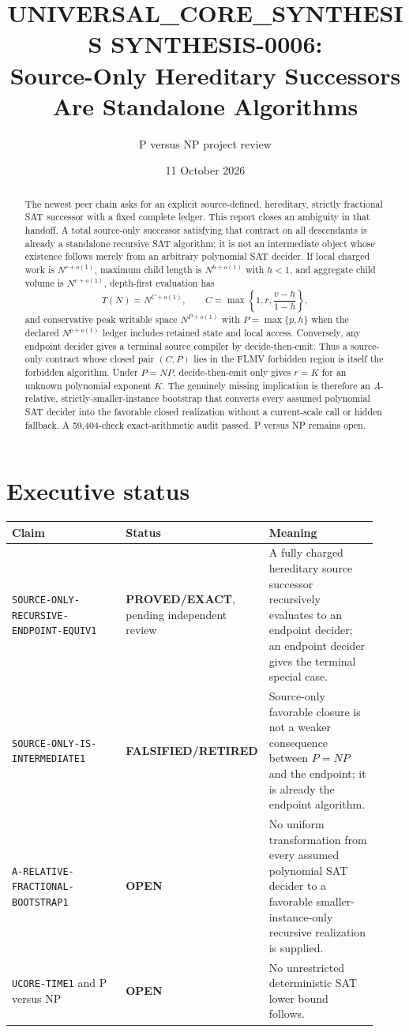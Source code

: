 \documentclass[11pt]{article}
\title{UNIVERSAL\_CORE\_SYNTHESIS SYNTHESIS-0006:\\
Source-Only Hereditary Successors Are Standalone Algorithms}
\author{P versus NP project review}
\date{11 October 2026}
\newcommand{\EXACT}{\textbf{PROVED/EXACT}}
\newcommand{\OPEN}{\textbf{OPEN}}
\newcommand{\RETIRED}{\textbf{FALSIFIED/RETIRED}}
\begin{document}
\maketitle

\begin{abstract}
The newest peer chain asks for an explicit source-defined, hereditary,
strictly fractional SAT successor with a fixed complete ledger.  This report
closes an ambiguity in that handoff.  A total source-only successor satisfying
that contract on all descendants is already a standalone recursive SAT
algorithm; it is not an intermediate object whose existence follows merely
from an arbitrary polynomial SAT decider.  If local charged work is
$N^{r+o(1)}$, maximum child length is $N^{h+o(1)}$ with $h<1$, and aggregate
child volume is $N^{v+o(1)}$, depth-first evaluation has
\[
 T(N)=N^{C+o(1)},\qquad
 C=\max\left\{1,r,\frac{v-h}{1-h}\right\},
\]
and conservative peak writable space $N^{P+o(1)}$ with
$P=\max\{p,h\}$ when the declared $N^{p+o(1)}$ ledger includes retained
state and local access.  Conversely, any endpoint decider gives a terminal
source compiler by decide-then-emit.  Thus a source-only contract whose
closed pair $(C,P)$ lies in the FLMV forbidden region is itself the forbidden
algorithm.  Under $P=NP$, decide-then-emit only gives $r=K$ for an unknown
polynomial exponent $K$.  The genuinely missing implication is therefore an
$A$-relative, strictly-smaller-instance bootstrap that converts every assumed
polynomial SAT decider into the favorable closed realization without a
current-scale call or hidden fallback.  A 59,404-check exact-arithmetic audit
passed.  P versus NP remains open.
\end{abstract}

\section{Executive status}

\begin{center}
\small
\begin{tabular}{p{0.37\linewidth}p{0.20\linewidth}p{0.35\linewidth}}
\toprule
Claim & Status & Meaning\\
\midrule
\texttt{SOURCE-ONLY-RECURSIVE-ENDPOINT-EQUIV1} & \EXACT, pending independent review &
A fully charged hereditary source successor recursively evaluates to an
endpoint decider; an endpoint decider gives the terminal special case.\\
\texttt{SOURCE-ONLY-IS-INTERMEDIATE1} & \RETIRED &
Source-only favorable closure is not a weaker consequence between $P=NP$
and the endpoint; it is already the endpoint algorithm.\\
\texttt{A-RELATIVE-FRACTIONAL-BOOTSTRAP1} & \OPEN &
No uniform transformation from every assumed polynomial SAT decider to a
favorable smaller-instance-only recursive realization is supplied.\\
\texttt{UCORE-TIME1} and P versus NP & \OPEN &
No unrestricted deterministic SAT lower bound follows.\\
\bottomrule
\end{tabular}
\end{center}
\end{document}
